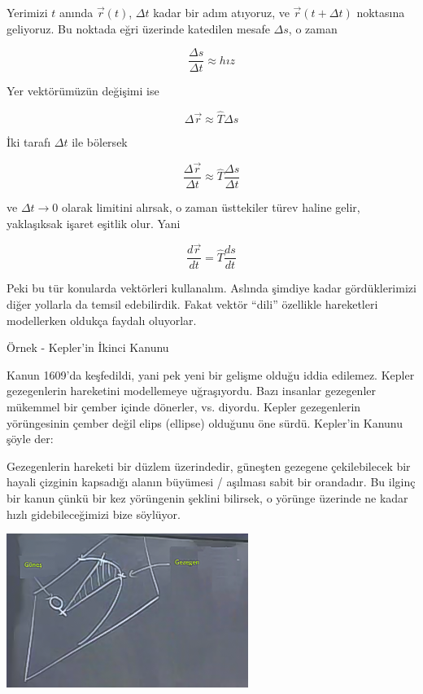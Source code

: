 \documentclass[12pt,fleqn]{article}\usepackage{../../common}
\begin{document}
Yerimizi $t$ anında $\vec{r}(t)$, $\Delta t$ kadar bir adım atıyoruz, ve
$\vec{r}(t+\Delta t)$ noktasına geliyoruz. Bu noktada eğri üzerinde katedilen
mesafe $\Delta s$, o zaman

$$ \frac{\Delta s}{\Delta t} \approx hız $$

Yer vektörümüzün değişimi ise 

$$ \Delta \vec{r} \approx \hat{T} \Delta s $$

İki tarafı $\Delta t$ ile bölersek 

$$ \frac{\Delta \vec{r}}{\Delta t} \approx \hat{T} \frac{\Delta s}{\Delta t} $$

ve $\Delta t \to 0$ olarak limitini alırsak, o zaman üsttekiler türev
haline gelir, yaklaşıksak işaret eşitlik olur. Yani

$$ \frac{d\vec{r}}{dt} = \hat{T}\frac{ds}{dt} $$

Peki bu tür konularda vektörleri kullanalım. Aslında şimdiye kadar
gördüklerimizi diğer yollarla da temsil edebilirdik. Fakat vektör ``dili''
özellikle hareketleri modellerken oldukça faydalı oluyorlar.

Örnek - Kepler'in İkinci Kanunu

Kanun 1609'da keşfedildi, yani pek yeni bir gelişme olduğu iddia
edilemez. Kepler gezegenlerin hareketini modellemeye uğraşıyordu. Bazı insanlar
gezegenler mükemmel bir çember içinde dönerler, vs. diyordu. Kepler gezegenlerin
yörüngesinin çember değil elips (ellipse) olduğunu öne sürdü. Kepler'in Kanunu
şöyle der:

Gezegenlerin hareketi bir düzlem üzerindedir, güneşten gezegene çekilebilecek
bir hayali çizginin kapsadığı alanın büyümesi / aşılması sabit bir orandadır. Bu
ilginç bir kanun çünkü bir kez yörüngenin şeklini bilirsek, o yörünge üzerinde
ne kadar hızlı gidebileceğimizi bize söylüyor.

\begin{center}
\includegraphics[height=5cm]{6_6.png}
\end{center}
\end{document}
